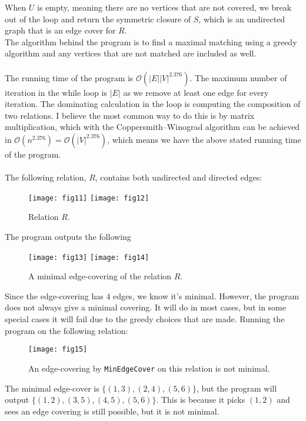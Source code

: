 \documentclass[a4paper, fleqn]{article}
\begin{document}
When $U$ is empty, meaning there are no vertices that are not covered, we break out of
the loop and return the symmetric closure of $S$, which is an undirected graph that is an
edge cover for $R$. \\
The algorithm behind the program is to find a maximal matching using a greedy algorithm
and any vertices that are not matched are included as well. \\
\\
The running time of the program is $\mathcal{O}(|E||V|^{2.376})$. The maximum number of
iteration in the while loop is $|E|$ as we remove at least one edge for every iteration.
The dominating calculation in the loop is computing the composition of two relations. I believe the most common way to do this is by matrix multiplication, which with the
Coppersmith–Winograd algorithm can be achieved in
$\mathcal{O}(n^{2.376})=\mathcal{O}(|V|^{2.376})$, which means we have the above stated
running time of the program. \\
\\
The following relation, $R$, contains both undirected and directed edges:
\begin{figure}[H]
  \centering
  \texttt{[image: fig11]}
  \texttt{[image: fig12]}
  \caption{Relation $R$.}
\end{figure}
The program outputs the following
\begin{figure}[H]
  \centering
  \texttt{[image: fig13]}
  \texttt{[image: fig14]}
  \caption{A minimal edge-covering of the relation $R$.}
\end{figure}
Since the edge-covering has $4$ edges, we know it's minimal. However, the program does
not always give a minimal covering. It will do in most cases, but in some special cases
it will fail due to the greedy choices that are made. Running the program on the
following relation:
\begin{figure}[H]
  \centering
  \texttt{[image: fig15]}
  \caption{An edge-covering by \texttt{MinEdgeCover} on this relation is not minimal.}
\end{figure}
The minimal edge-cover is $\{(1,3), (2,4), (5,6)\}$, but the program will output
$\{(1,2),(3,5),(4,5),(5,6)\}$. This is because it picks $(1,2)$ and sees an edge covering
is still possible, but it is not minimal.
\end{document}

